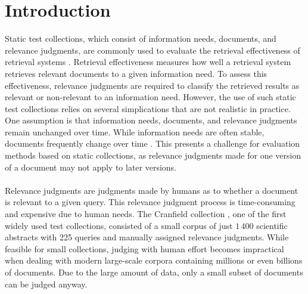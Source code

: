 \chapter{Introduction}\label{introduction} 

Static test collections, which consist of information needs, documents, and relevance judgments, are commonly used to evaluate the retrieval effectiveness of retrieval systems \citep{sanderson:2010}. Retrieval effectiveness measures how well a retrieval system retrieves relevant documents to a given information need. To assess this effectiveness, relevance judgments are required to classify the retrieved results as relevant or non-relevant to an information need. However, the use of such static test collections relies on several simplications that are not realistic in practice. One assumption is that information needs, documents, and relevance judgments remain unchanged over time. While information needs are often stable, documents frequently change over time \mbox{\citep{cho:2000}}. This presents a challenge for evaluation methods based on static collections, as relevance judgments made for one version of a document may not apply to later versions.
\\\\
Relevance judgments are judgments made by humans as to whether a document is relevant to a given query. This relevance judgment process is time-consuming and expensive due to human needs. The Cranfield collection \citep{cleverdon:91}, one of the first widely used test collections, consisted of a small corpus of just $1\,400$ scientific abstracts with 225 queries and manually assigned relevance judgments. While feasible for small collections, judging with human effort becomes impractical when dealing with modern large-scale corpora containing millions or even billions of documents. Due to the large amount of data, only a small subset of documents can be judged anyway. 
\\\\\\\\\\\\
